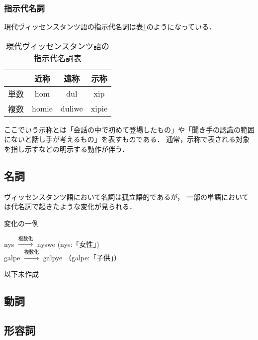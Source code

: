 \documentclass[a4paper,xelatex,ja=standard]{bxjsarticle}
\begin{document}
\subsubsection{指示代名詞}
現代ヴィッセンスタンツ語の指示代名詞は表\ref{vic_obj_pronoum}のようになっている．
\begin{table}[htbp]
 \caption{現代ヴィッセンスタンツ語の指示代名詞表}
 \label{vic_obj_pronoum}
 \begin{center}
  \begin{liparxecc}
   \begin{tabular}{|c||c|c|c|} \hline
    & 近称 & 遠称 & 示称 \\ \hline \hline
    単数 & hom & dul & xip \\ \hline
    複数 & homie & duliwe & xipie \\ \hline
   \end{tabular}
  \end{liparxecc}
 \end{center}
\end{table}

ここでいう示称とは「会話の中で初めて登場したもの」や「聞き手の認識の範囲にないと話し手が考えるもの」を表すものである．
通常，示称で表される対象を指し示すなどの明示する動作が伴う．

\subsection{名詞}
ヴィッセンスタンツ語において名詞は孤立語的であるが，
一部の単語においては代名詞で起きたような変化が見られる．
\begin{itembox}[l]{変化の一例}
 \begin{liparxecc}
   \begin{center}
    nys $\xrightarrow{\text{複数化}}$ nyswe (nys\text:「女性」) \\
    galpe $\xrightarrow{\text{複数化}}$ galpye （galpe:「子供」）
   \end{center}
 \end{liparxecc}
\end{itembox}

以下未作成

\subsection{動詞}
\subsection{形容詞}
\end{document}
